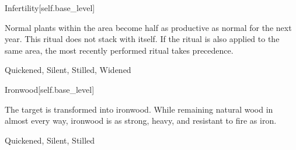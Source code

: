 \begin{spellsection}{Infertility}[self.base_level]
\begin{spellcontent}
\begin{spelltargetinginfo}
\end{spelltargetinginfo}
\begin{spelleffects}
\spelleffect
Normal plants within the area become half as productive as normal for the next year.
This ritual does not stack with itself.
If the  ritual is also applied to the same area, the most recently performed ritual takes precedence.
\end{spelleffects}
\end{spellcontent}
\begin{spellfooter}
 Quickened, Silent, Stilled, Widened
\end{spellfooter}
\begin{spellsubcontent}
\end{spellsubcontent}
\end{spellsection}
\begin{spellsection}{Ironwood}[self.base_level]
\begin{spellcontent}
\begin{spelltargetinginfo}
\end{spelltargetinginfo}
\begin{spelleffects}
\spelleffect
The target is transformed into ironwood.
While remaining natural wood in almost every way, ironwood is as strong, heavy, and resistant to fire as iron.
\end{spelleffects}
\end{spellcontent}
\begin{spellfooter}
 Quickened, Silent, Stilled
\end{spellfooter}
\begin{spellsubcontent}
\end{spellsubcontent}
\end{spellsection}

